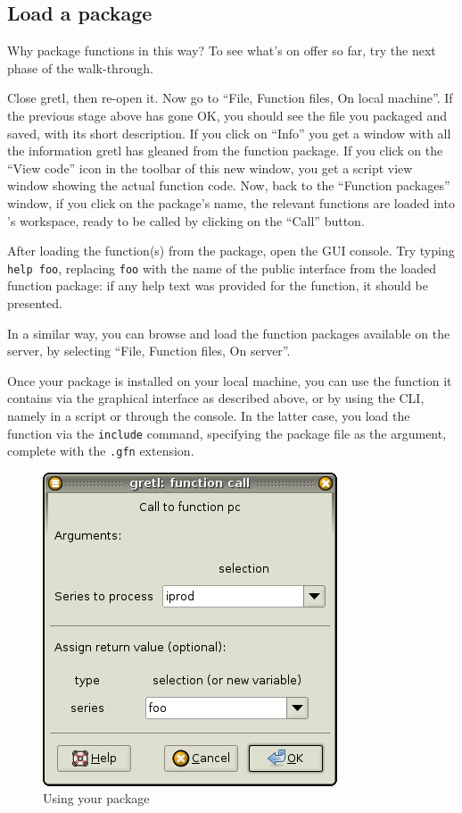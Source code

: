 \subsection{Load a package}

Why package functions in this way?  To see what's on offer so far, try
the next phase of the walk-through.

Close gretl, then re-open it.  Now go to ``File, Function files, On
local machine''. If the previous stage above has gone OK, you should
see the file you packaged and saved, with its short description.  If
you click on ``Info'' you get a window with all the information gretl
has gleaned from the function package.  If you click on the ``View
code'' icon in the toolbar of this new window, you get a script view
window showing the actual function code. Now, back to the ``Function
packages'' window, if you click on the package's name, the relevant
functions are loaded into 's workspace, ready to be called
by clicking on the ``Call'' button.

After loading the function(s) from the package, open the GUI console.
Try typing \texttt{help foo}, replacing \texttt{foo} with the name of
the public interface from the loaded function package: if any help text
was provided for the function, it should be presented.

In a similar way, you can browse and load the function packages
available on the  server, by selecting ``File, Function
files, On server''.

Once your package is installed on your local machine, you can use the
function it contains via the graphical interface as described above,
or by using the CLI, namely in a script or through the console. In the
latter case, you load the function via the \texttt{include} command,
specifying the package file as the argument, complete with the
\texttt{.gfn} extension.

\begin{figure}[htbp]
  \centering
  \includegraphics[scale=0.5]{figures/function_call}
  \caption{Using your package}
  \label{fig:function_call}
\end{figure}

